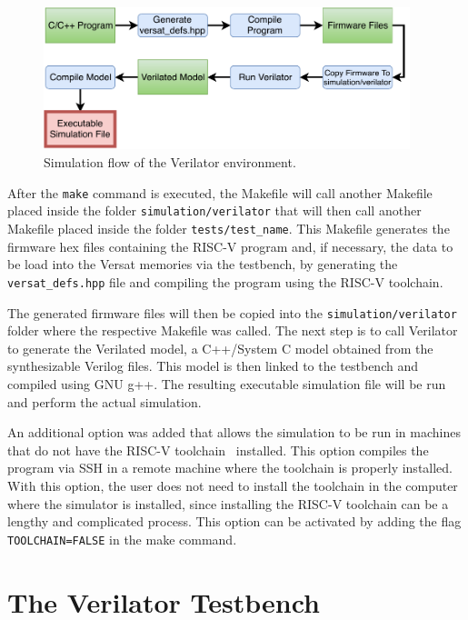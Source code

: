 \begin{figure}[!htb]
	\centering
	\includegraphics[width=0.95\textwidth]{Figures/Sim_flow.pdf}
	\caption{Simulation flow of the Verilator environment.}
	\label{fig:sim_flow}
\end{figure}

After the {\tt make} command is executed, the Makefile will call another
Makefile placed inside the folder {\tt simulation/verilator} that will then call
another Makefile placed inside the folder {\tt tests/test\_name}. This Makefile
generates the firmware hex files containing the RISC-V program and, if necessary, the 
data to be load into the Versat memories via the testbench, by generating the {\tt 
versat\_defs.hpp} file and compiling the program using the RISC-V toolchain.

The generated firmware files will then be copied into the {\tt simulation/verilator} 
folder where the respective Makefile was called. The next step is to call
Verilator to generate the Verilated model, a C++/System C model obtained from the
synthesizable Verilog files. This model is then linked to the testbench and compiled 
using GNU g++. The resulting executable simulation file will be run and perform 
the actual simulation.

An additional option was added that allows the simulation to be run in machines
that do not have the RISC-V toolchain~\cite{gnu:riscv} installed. This option
compiles the program via SSH in a remote machine where the toolchain is properly
installed. With this option, the user does not need to install the toolchain in
the computer where the simulator is installed, since installing the RISC-V toolchain can 
be a lengthy and complicated process. This option can be activated by adding the flag 
{\tt TOOLCHAIN=FALSE} in the make command.

\section{The Verilator Testbench}
\label{tb_verilator}

